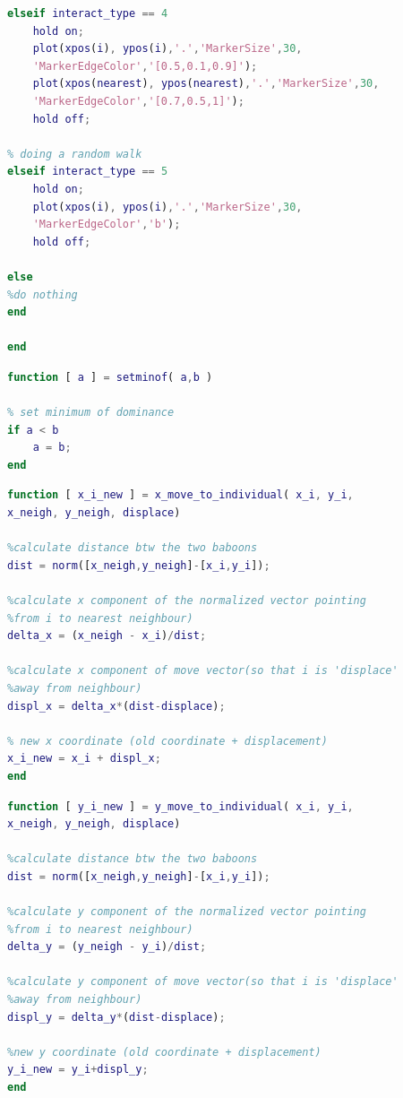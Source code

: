 \documentclass[11pt]{article}
\begin{document}
\begin{lstlisting}[language=Matlab, backgroundcolor=\color{blue!10}, frame=single, framerule=0.1pt,commentstyle=\color{blue}, caption=function: plotinteraction.m]
% nearest grooms i
elseif interact_type == 4
    hold on;
    plot(xpos(i), ypos(i),'.','MarkerSize',30,
    'MarkerEdgeColor','[0.5,0.1,0.9]');
    plot(xpos(nearest), ypos(nearest),'.','MarkerSize',30,
    'MarkerEdgeColor','[0.7,0.5,1]');
    hold off;
    
% doing a random walk
elseif interact_type == 5
    hold on;
    plot(xpos(i), ypos(i),'.','MarkerSize',30,
    'MarkerEdgeColor','b');
    hold off;

else
%do nothing
end

end
\end{lstlisting}

\begin{lstlisting}[language=Matlab, backgroundcolor=\color{blue!10}, frame=single, framerule=0.1pt,commentstyle=\color{blue}, caption=function: setminof.m]
function [ a ] = setminof( a,b )

% set minimum of dominance
if a < b
    a = b;
end
\end{lstlisting}

\begin{lstlisting}[language=Matlab, backgroundcolor=\color{blue!10}, frame=single, framerule=0.1pt,commentstyle=\color{blue}, caption=function: x\_move\_to\_individual.m]
function [ x_i_new ] = x_move_to_individual( x_i, y_i, 
x_neigh, y_neigh, displace)

%calculate distance btw the two baboons
dist = norm([x_neigh,y_neigh]-[x_i,y_i]);

%calculate x component of the normalized vector pointing 
%from i to nearest neighbour)
delta_x = (x_neigh - x_i)/dist;

%calculate x component of move vector(so that i is 'displace' 
%away from neighbour)
displ_x = delta_x*(dist-displace);

% new x coordinate (old coordinate + displacement)
x_i_new = x_i + displ_x;
end
\end{lstlisting}

\begin{lstlisting}[language=Matlab, backgroundcolor=\color{blue!10}, frame=single, framerule=0.1pt,commentstyle=\color{blue}, caption=function: y\_move\_to\_individual.m]
function [ y_i_new ] = y_move_to_individual( x_i, y_i, 
x_neigh, y_neigh, displace)

%calculate distance btw the two baboons
dist = norm([x_neigh,y_neigh]-[x_i,y_i]);

%calculate y component of the normalized vector pointing 
%from i to nearest neighbour)
delta_y = (y_neigh - y_i)/dist;

%calculate y component of move vector(so that i is 'displace' 
%away from neighbour)
displ_y = delta_y*(dist-displace);

%new y coordinate (old coordinate + displacement)
y_i_new = y_i+displ_y;
end
\end{lstlisting}
\end{document}
